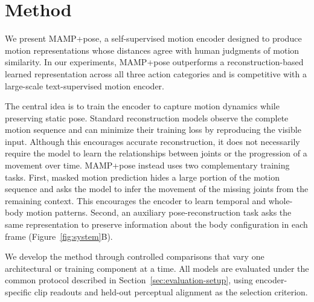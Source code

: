 \documentclass[letterpaper]{article} %
\begin{document}
\section{Method}
We present MAMP+pose, a self-supervised motion encoder designed to produce motion representations whose distances agree with human judgments of motion similarity. In our experiments, MAMP+pose outperforms a reconstruction-based learned representation across all three action categories and is competitive with a large-scale text-supervised motion encoder.

The central idea is to train the encoder to capture motion dynamics while preserving static pose. Standard reconstruction models observe the complete motion sequence and can minimize their training loss by reproducing the visible input. Although this encourages accurate reconstruction, it does not necessarily require the model to learn the relationships between joints or the progression of a movement over time. MAMP+pose instead uses two complementary training tasks. First, masked motion prediction hides a large portion of the motion sequence and asks the model to infer the movement of the missing joints from the remaining context. This encourages the encoder to learn temporal and whole-body motion patterns. Second, an auxiliary pose-reconstruction task asks the same representation to preserve information about the body configuration in each frame (Figure~\ref{fig:system}B).



We develop the method through controlled comparisons that vary one architectural or training component at a time. All models are evaluated under the common protocol described in Section~\ref{sec:evaluation-setup}, using encoder-specific clip readouts and held-out perceptual alignment as the selection criterion.

\end{document}
